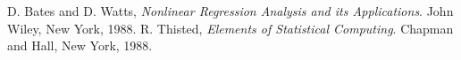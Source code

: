 \documentclass{article}
\begin{document}
\pagebreak

\begin{thebibliography}{10}
 D. Bates and D. Watts, {\sl Nonlinear Regression
    Analysis and its Applications}.  John Wiley, New York, 1988.
 R. Thisted, {\sl Elements of Statistical Computing}.
Chapman and Hall, New York, 1988.
\end{thebibliography}
\end{document}
